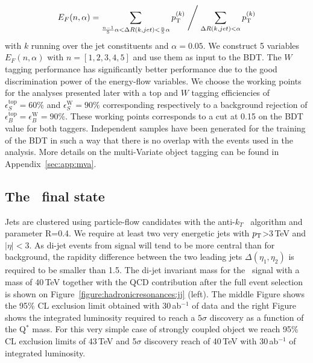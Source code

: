 \documentclass[a4paper,11pt]{article}
\begin{document}
\begin{equation}
E_{F}(n,\alpha) =  \sum \limits_{\frac{n-1}{5}\alpha < \Delta R(k,jet)< \frac{n}{5}\alpha} p_{\text{T}}^{(k)} \Biggm/ \sum \limits_{\Delta R(k,jet)< \alpha} p_{\text{T}}^{(k)}
\end{equation}
with $k$ running over the jet constituents and $\alpha=0.05$. We construct 5 variables $E_{F}(n,\alpha)$ with $n=[1,2,3,4,5]$ and use them as input to the BDT.
The $W$ tagging performance has significantly better performance due to the good discrimination power of the energy-flow variables. We choose the working points for the analyses presented later with a top and $W$ tagging efficiencies of $\epsilon_S^{\text{top}}=60\%$ and $\epsilon_S^{\text{W}}=90\%$ corresponding respectively to a background rejection of $\epsilon_B^{\text{top}}=\epsilon_B^{\text{W}}=90\%$. These working points corresponds to a cut at 0.15 on the BDT value for both taggers. Independent samples have been generated for the training of the BDT in such a way that there is no overlap with the events used in the analysis.  More details on the multi-Variate object tagging can be found in Appendix~\ref{sec:app:mva}.

\subsection{The \jj\ final state}
\label{sec:hadjj}

Jets are clustered using particle-flow candidates with the anti-$k_T$~\cite{Cacciari:2008gp} algorithm and  parameter R=0.4. We require at least two very energetic jets with $p_{\text{T}}$>3\,TeV and $|\eta|<3$. As di-jet events from signal will tend to be more central than for background, the rapidity difference between the two leading jets $\Delta(\eta_1, \eta_2)$ is required to be smaller than 1.5. The di-jet invariant mass for the \qjj\ signal with a mass of 40\,TeV together with the QCD contribution after the full event selection is shown on Figure~\ref{figure:hadronicresonances:jj} (left). The middle Figure shows the 95\% CL exclusion limit obtained with 30\,ab$^{-1}$ of data and the right Figure shows the integrated luminosity required to reach a $5\sigma$ discovery as a function of the Q$^*$ mass. For this very simple case of strongly coupled object we reach 95\% CL exclusion limits of 43\,TeV and 5$\sigma$ discovery reach of 40\,TeV with 30\,ab$^{-1}$ of integrated luminosity. 
\end{document}
